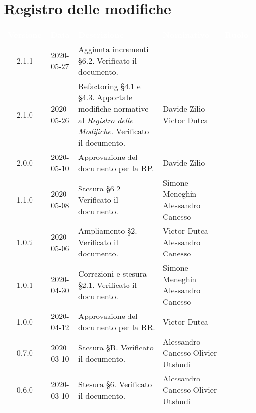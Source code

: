 \section*{Registro delle modifiche}
{
	\centering
	\begin{longtable}{ c c  C{4cm}  C{4cm}  C{3cm} }
		\textcolor{white}{\textbf{Versione}} & \textcolor{white}{\textbf{Data}} & \textcolor{white}{\textbf{Descrizione}} & \textcolor{white}{\textbf{Nominativo}} & \textcolor{white}{\textbf{Ruolo}}\\		
		2.1.1 & 2020-05-27 & Aggiunta incrementi \S 6.2. Verificato il documento. & &\adm{} \newline \ver{} \\
		2.1.0 & 2020-05-26 & Refactoring \S 4.1 e \S 4.3. Apportate modifiche normative al \textit{Registro delle Modifiche}. Verificato il documento. & Davide Zilio \newline Victor Dutca & \adm{} \newline \ver{} \\
		2.0.0 & 2020-05-10 & Approvazione del documento per la RP. & Davide Zilio &\RdP{} \\
		1.1.0 & 2020-05-08 & Stesura \S 6.2. Verificato il documento. & Simone Meneghin \newline Alessandro Canesso &\adm{} \newline \ver{}\\
		1.0.2 & 2020-05-06 & Ampliamento \S 2. Verificato il documento. & Victor Dutca \newline Alessandro Canesso &\Res{} \newline \ver{}\\
		1.0.1 & 2020-04-30 & Correzioni e stesura \S 2.1. Verificato il documento. & Simone Meneghin \newline Alessandro Canesso &\Res{} \newline \ver{}\\
		1.0.0 & 2020-04-12 & Approvazione del documento per la RR. & Victor Dutca &\RdP{} \\
		0.7.0 & 2020-03-10 & Stesura \S B. Verificato il documento. & Alessandro Canesso \newline Olivier Utshudi &\Res{} \newline \ver{}\\
		0.6.0 & 2020-03-10 & Stesura \S 6. Verificato il documento. & Alessandro Canesso \newline Olivier Utshudi &\Res{} \newline \ver{}\\

\end{longtable}}
